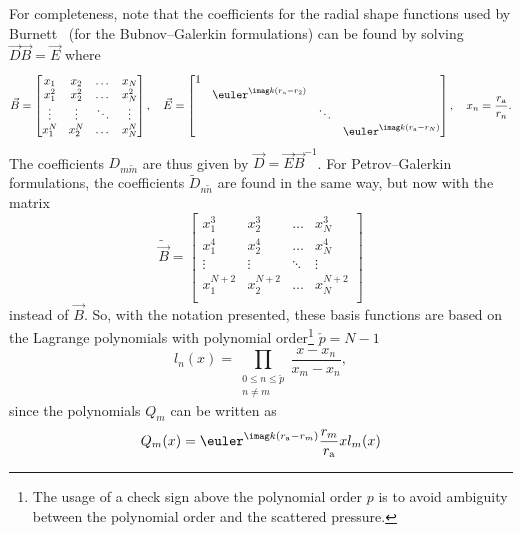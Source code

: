 For completeness, note that the coefficients for the radial shape functions used by Burnett~\cite{Burnett1994atd} (for the Bubnov--Galerkin formulations) can be found by solving $\vec{D}\vec{B} = \vec{E}$ where
\begin{equation*}
	\vec{B} = \begin{bmatrix}
		x_1 & x_2 & \dots & x_N\\
		x_1^2 & x_2^2 & \dots & x_N^2\\
		\vdots & \vdots & \ddots & \vdots\\
		x_1^N & x_2^N & \dots & x_N^N\\
	\end{bmatrix},\quad \vec{E} = \begin{bmatrix}
		1 	& 	&  & \\
		   	& \euler^{\imag k (r_{\mathrm{a}}-r_2)} & & \\
			&  		& \ddots 	&\\
			&  		& 			& \euler^{\imag k (r_{\mathrm{a}}-r_N)}
	\end{bmatrix}, \quad x_n = \frac{r_{\mathrm{a}}}{r_n}.
\end{equation*}
The coefficients $D_{m\tilde{m}}$ are thus given by $\vec{D} = \vec{E}\vec{B}^{-1}$. For Petrov--Galerkin formulations, the coefficients $\tilde{D}_{n\tilde{n}}$ are found in the same way, but now with the matrix
\begin{equation*}
	\tilde{\vec{B}} = \begin{bmatrix}
		x_1^3 & x_2^3 & \dots & x_N^3\\
		x_1^4 & x_2^4 & \dots & x_N^4\\
		\vdots & \vdots & \ddots & \vdots\\
		x_1^{N+2} & x_2^{N+2} & \dots & x_N^{N+2}\\
	\end{bmatrix}
\end{equation*}
instead of $\vec{B}$. So, with the notation presented, these basis functions are based on the Lagrange polynomials with polynomial order\footnote{The usage of a check sign above the polynomial order $p$ is to avoid ambiguity between the polynomial order and the scattered pressure.} $\check{p}=N-1$
\begin{equation}
	l_n(x) = \prod_{\substack{0\leq n\leq \check{p}\\ n\neq m}} \frac{x-x_n}{x_m-x_n},
\end{equation}
since the polynomials $Q_m$ can be written as
\begin{equation*}
	Q_m(x) = \euler^{\imag k(r_{\mathrm{a}}-r_m)} \frac{r_m}{r_{\mathrm{a}}} xl_m(x)
\end{equation*}
